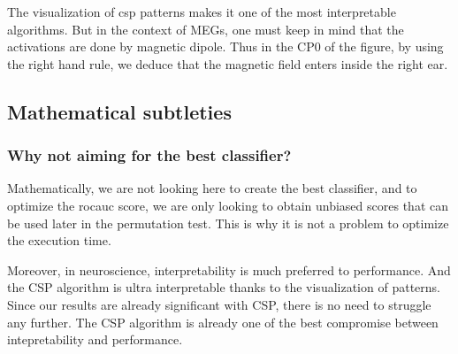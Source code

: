 The visualization of csp patterns makes it one of the most interpretable algorithms. But in the context of MEGs, one must keep in mind that the activations are done by magnetic dipole. Thus in the CP0 of the figure, by using the right hand rule, we deduce that the magnetic field enters inside the right ear.

\subsection{Mathematical subtleties}

\subsubsection{Why not aiming for the best classifier?}
Mathematically, we are not looking here to create the best classifier, and to optimize the rocauc score, we are only looking to obtain unbiased scores that can be used later in the permutation test. This is why it is not a problem to optimize the execution time.

Moreover, in neuroscience, interpretability is much preferred to performance. And the CSP algorithm is ultra interpretable thanks to the visualization of patterns. Since our results are already significant with CSP, there is no need to struggle any further. The CSP algorithm is already one of the best compromise between intepretability and performance.





